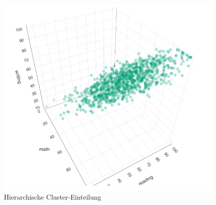 \documentclass[
	handout,
  	aspectratio=169
]{beamer}
\begin{document}
	\begin{frame}
	\begin{center}					
					\begin{figure}[h]
						\includegraphics[scale=0.6]{../pictures/cluster_hier.png}
						\caption{Hierarchische Cluster-Einteilung}		
					\end{figure}	
				\end{center}	
	\end{frame}
			
			
\end{document}

